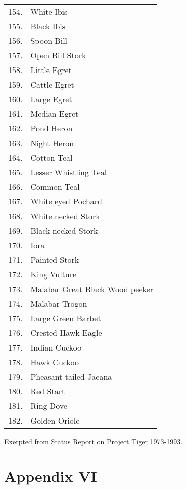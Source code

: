 {\begin{longtable}{cl}
154. & White Ibis \\
155. & Black Ibis \\
156. & Spoon Bill \\
157. & Open Bill Stork \\
158. & Little Egret \\
159. & Cattle Egret \\
160. & Large Egret \\
161. & Median Egret \\
162. & Pond Heron \\
163. & Night Heron \\
164. & Cotton Teal \\
165. & Lesser Whistling Teal \\
166. & Common Teal \\
167. & White eyed Pochard \\
168. & White necked Stork \\
169. & Black necked Stork \\
170. & Iora \\
171. & Painted Stork \\
172. & King Vulture \\
173. & Malabar Great Black Wood peeker \\
174. & Malabar Trogon \\
175. & Large Green Barbet \\
176. & Crested Hawk Eagle \\
177. & Indian Cuckoo \\
178. & Hawk Cuckoo \\
179. & Pheasant tailed Jacana \\
180. & Red Start \\
181. & Ring Dove \\
182. & Golden Oriole
\end{longtable}}

{\centerline{Exerpted from Status Report on Project Tiger 1973-1993.}}

\newpage

\chapter*{Appendix VI}

